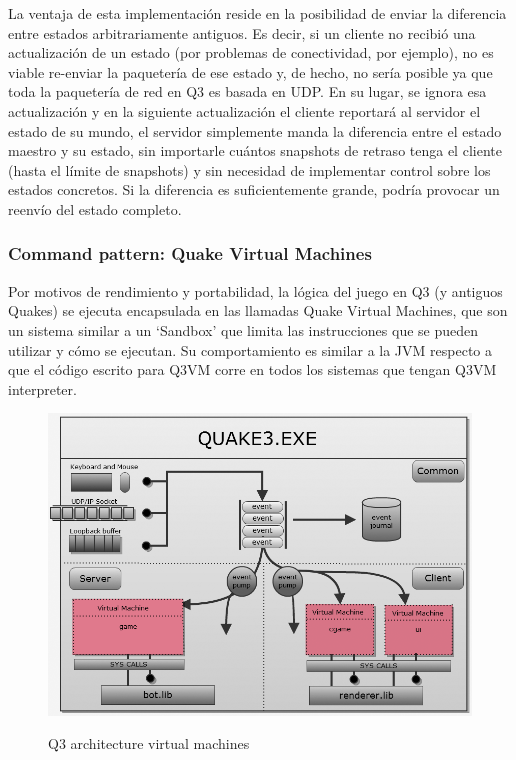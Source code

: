 \documentclass[a4paper,12pt]{report}
\begin{document}
	La ventaja de esta implementación reside en la posibilidad de enviar la diferencia entre estados arbitrariamente antiguos. Es decir, si un cliente no recibió una actualización de un estado (por problemas de conectividad, por ejemplo), no es viable re-enviar la paquetería de ese estado y, de hecho, no sería posible ya que toda la paquetería de red en Q3 es basada en UDP. En su lugar, se ignora esa actualización y en la siguiente actualización el cliente reportará al servidor el estado de su mundo, el servidor simplemente manda la diferencia entre el estado maestro y su estado, sin importarle cuántos snapshots de retraso tenga el cliente (hasta el límite de snapshots) y sin necesidad de implementar control sobre los estados concretos. Si la diferencia es suficientemente grande, podría provocar un reenvío del estado completo.
	

	\subsubsection{Command pattern: Quake Virtual Machines}
	
	Por motivos de rendimiento y portabilidad, la lógica del juego en Q3 (y antiguos Quakes) se ejecuta encapsulada en las llamadas Quake Virtual Machines, que son un sistema similar a un `Sandbox' que limita las instrucciones que se pueden utilizar y cómo se ejecutan. Su comportamiento es similar a la JVM respecto a que el código escrito para Q3VM corre en todos los sistemas que tengan Q3VM interpreter. \cite{q3vm}\\
	
	\begin{center}
		\begin{figure}[h]
			\includegraphics[width=1\textwidth]{images/q3_workspace_architecture}
			\label{fig:q3vm}
			\caption{Q3 architecture virtual machines}
		\end{figure}
	\end{center}
	
\end{document}
